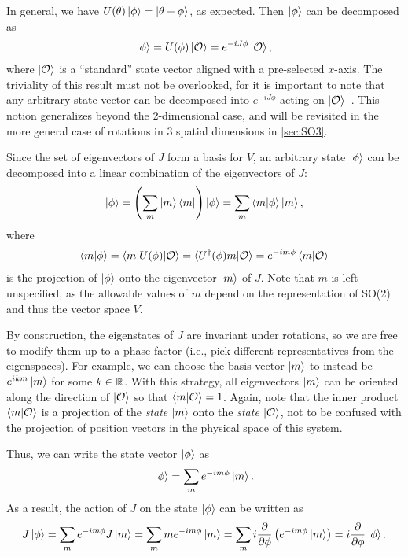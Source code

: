     In general, we have $U(\theta)\ket{\phi} = \ket{\theta+\phi}$, as expected. Then $\ket{\phi}$ can be decomposed as
    \begin{align*}
        \ket{\phi} = U(\phi)\ket{\mathcal{O}} = e^{-iJ\phi}\ket{\mathcal{O}},
    \end{align*}
    where $\ket{\mathcal{O}}$ is a ``standard'' state vector aligned with a pre-selected $x$-axis. The triviality of this result must not be overlooked, for it is important to note that any arbitrary state vector can be decomposed into $e^{-iJ\phi}$ acting on $\ket{\mathcal{O}}$~\cite{Tung1985}. This notion generalizes beyond the 2-dimensional case, and will be revisited in the more general case of rotations in 3 spatial dimensions in \cref{sec:SO3}.

    Since the set of eigenvectors of $J$ form a basis for $V$, an arbitrary state $\ket{\phi}$ can be decomposed into a linear combination of the eigenvectors of $J$:
    \begin{align*}
        \ket{\phi} = \left( \sum_{m} \ket{m}\bra{m} \right)\ket{\phi} = \sum_{m} \braket{m|\phi}\ket{m},
    \end{align*}
    where
    \begin{align*}
        \braket{m|\phi} = \braket{m|U(\phi)|\mathcal{O}} = \braket{U^\dagger(\phi)m|\mathcal{O}} = e^{-im\phi}\braket{m|\mathcal{O}}
    \end{align*}
    is the projection of $\ket{\phi}$ onto the eigenvector $\ket{m}$ of $J$. Note that $m$ is left unspecified, as the allowable values of $m$ depend on the representation of SO(2) and thus the vector space $V$.

    By construction, the eigenstates of $J$ are invariant under rotations, so we are free to modify them up to a phase factor (i.e., pick  different representatives from the eigenspaces). For example, we can choose the basis vector $\ket{m}$ to instead be $e^{ikm}\ket{m}$ for some $k\in\mathbb{R}$.  With this strategy, all eigenvectors $\ket{m}$ can be oriented along the direction of $\ket{\mathcal{O}}$ so that $\braket{m|\mathcal{O}} = 1$. Again, note that the inner product $\braket{m|\mathcal{O}}$ is a projection of the \textit{state} $\ket{m}$ onto the \textit{state} $\ket{\mathcal{O}}$, not to be confused with the projection of position vectors in the physical space of this system.

    Thus, we can write the state vector $\ket{\phi}$ as
    \begin{align}
        \ket{\phi} = \sum_{m} e^{-im\phi}\ket{m}.\label{eq:phi2m}
    \end{align}
    As a result, the action of $J$ on the state $\ket{\phi}$ can be written as
    \begin{align*}
        J\ket{\phi} = \sum_{m} e^{-im\phi} J\ket{m} = \sum_{m} m e^{-im\phi}\ket{m} = \sum_{m} i \frac{\partial}{\partial\phi} \left( e^{-im\phi}\ket{m} \right) = i\frac{\partial}{\partial\phi}\ket{\phi}.
    \end{align*}

